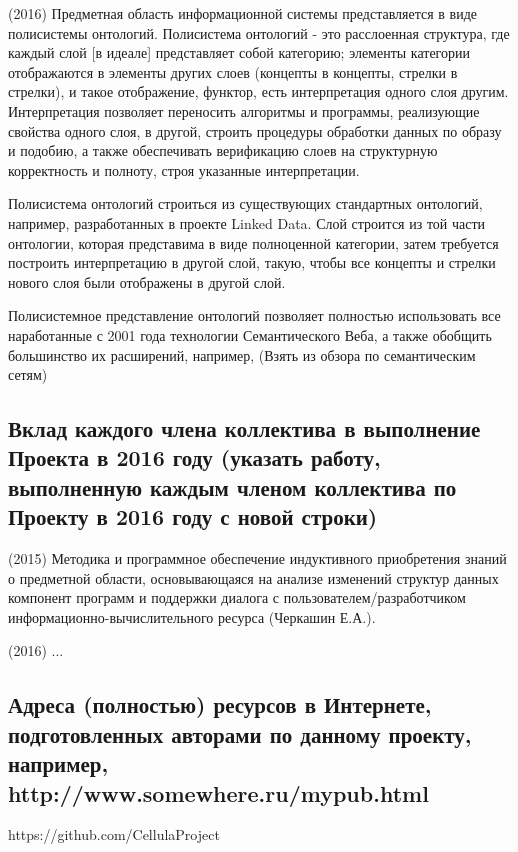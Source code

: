 \documentclass[12pt,a4paper]{ltxdoc}
\begin{document}
(2016) Предметная область информационной системы представляется в виде полисистемы онтологий. Полисистема онтологий - это расслоенная структура, где каждый слой [в идеале] представляет собой категорию; элементы категории отображаются в элементы других слоев (концепты в концепты, стрелки в стрелки), и такое отображение, функтор, есть интерпретация одного слоя другим. Интерпретация позволяет переносить алгоритмы и программы, реализующие свойства одного слоя, в другой, строить процедуры обработки данных по образу и подобию, а также обеспечивать верификацию слоев на структурную корректность и полноту, строя указанные интерпретации.

Полисистема онтологий строиться из существующих стандартных онтологий, например, разработанных в проекте Linked Data. Слой строится из той части онтологии, которая представима в виде полноценной категории, затем требуется построить интерпретацию в другой слой, такую, чтобы все концепты и стрелки нового слоя были отображены в другой слой.

Полисистемное представление онтологий позволяет полностью использовать все наработанные с 2001 года технологии Семантического Веба, а также обобщить большинство их расширений, например, (Взять из обзора по семантическим сетям)




\subsection{Вклад каждого члена коллектива в выполнение Проекта в 2016 году
  (указать работу, выполненную каждым членом коллектива по Проекту в 2016 году с
  новой строки)}
(2015) Методика и программное обеспечение индуктивного приобретения знаний о предметной области, основывающаяся на анализе изменений структур данных компонент программ и поддержки диалога с пользователем/разработчиком информационно-вычислительного ресурса (Черкашин Е.А.).

(2016) ...


\subsection{Адреса (полностью) ресурсов в Интернете, подготовленных авторами по
  данному проекту, например, http://www.somewhere.ru/mypub.html}

https://github.com/CellulaProject

\subsection{}
\end{document}
